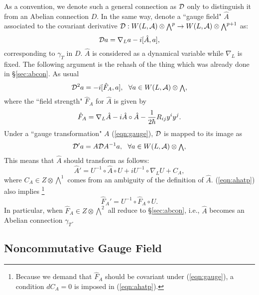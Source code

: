 \documentclass[10pt,a4paper]{article}
\def\h{\hbar}
\def\hA{{\hat A}}
\begin{document}
As a convention, we denote such a general connection as ${\cal D}$ only to distinguish it from an Abelian connection $D$. In the same way, denote a ``gauge field" $\hA$ associated to the covariant derivative ${\cal D}:W(L,{\cal A})\otimes {\scriptstyle \bigwedge}^p\rightarrow W(L,{\cal A})\otimes {\scriptstyle \bigwedge}^{p+1}$ as:
\begin{equation}
\label{eqn:ahat}
{\cal D}a=\nabla_La-i[\hA,a],
\end{equation}
corresponding to $\gamma_T$ in $D$. $\hA$ is considered as a dynamical variable while $\nabla_L$ is fixed. The following argument is the rehash of the thing which was already done in \S\ref{sec:abcon}. As usual 
\begin{equation}
{\cal D}^2a=-i[{\hat F}_A,a],\ \ \forall a\in W(L,{\cal A})\otimes {\scriptstyle \bigwedge},
\end{equation}
where the ``field strength" ${\hat F}_A$ for $\hA$ is given by
\begin{equation}
\label{eqn:fhata}
{\hat F}_A=\nabla_L\hA-i\hA\circ\hA-{1\over2\h}R_{ij}y^iy^j.
\end{equation}
Under a ``gauge transformation" $A$ (\ref{eqn:gauge}), ${\cal D}$ is mapped to its image as
\begin{equation}
\label{eqn:caldp}
{\cal D}'a=A{\cal D}A^{-1}a,\ \ \forall a\in W(L,{\cal A})\otimes {\scriptstyle \bigwedge},
\end{equation}
This means that $\hA$ should transform as follows:
\begin{equation}
\label{eqn:ahatp}
\hA'=U^{-1}\circ \hA\circ U+iU^{-1}\circ \nabla_L U+C_A,
\end{equation}
where $C_A\in Z\otimes {\scriptstyle \bigwedge}^1$ comes from an ambiguity of the definition of $\hA$. (\ref{eqn:ahatp}) also implies
\footnote{Because we demand that ${\hat F}_A$ should be covariant under (\ref{eqn:gauge}), a condition $dC_A=0$ is imposed in (\ref{eqn:ahatp}).}
\begin{equation}
{\hat F}_A'=U^{-1}\circ {\hat F}_A \circ U.
\end{equation}
In particular, when ${\hat F}_A\in Z\otimes{\scriptstyle \bigwedge}^2$ all reduce to \S\ref{sec:abcon}, i.e., $\hA$ becomes an Abelian connection $\gamma_T$. 



\subsection{Noncommutative Gauge Field
\label{sec:ncgfss}}
\end{document}
